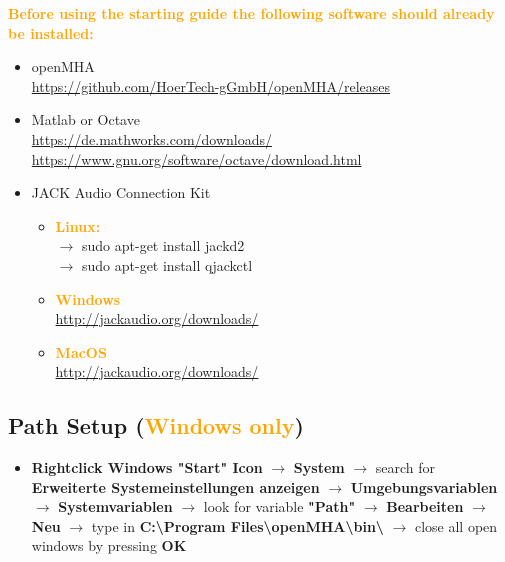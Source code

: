 \documentclass[11pt,a4paper,twoside]{article}
\newcommand{\+}{\discretionary{\mbox{\scriptsize$\hookleftarrow$}}{}{}}
\begin{document}
\textcolor{orange}{\textbf{Before using the starting guide the following software should already be installed:}}

\begin{itemize}
   \item \large{{openMHA}}   \\
     \footnotesize{\url{https://github.com/HoerTech-gGmbH/openMHA/releases}} 
   \item \large{{Matlab or Octave}}    \\
     \footnotesize{\url{https://de.mathworks.com/downloads/}} \\
     \footnotesize{\url{https://www.gnu.org/software/octave/download.html}}
   \item \large{{JACK Audio Connection Kit}}
   \begin{itemize}
   \item \textcolor{orange}{\textbf{Linux:}} \\
   $\rightarrow$ {\ttfamily sudo apt-get install jackd2} \\
   $\rightarrow$ {\ttfamily sudo apt-get install qjackctl}
   \item \textcolor{orange}{\textbf{Windows}} \\
   \footnotesize{\url{http://jackaudio.org/downloads/}}
   \item \textcolor{orange}{\textbf{MacOS}} \\
   \footnotesize{\url{http://jackaudio.org/downloads/}} %
   \end{itemize}
\end{itemize}

\subsection{Path Setup (\textcolor{orange}{Windows only})}
\label{subsec:windows_path_setup}

\begin{itemize}
\item \textbf{Rightclick Windows "Start" Icon} $\rightarrow$ \textbf{System} $\rightarrow$ search for \textbf{Erweiterte Systemeinstellungen anzeigen} $\rightarrow$ \textbf{Umgebungsvariablen} $\rightarrow$ \textbf{Systemvariablen} $\rightarrow$ look for variable \textbf{"Path"} $\rightarrow$ \textbf{Bearbeiten} $\rightarrow$ \textbf{Neu} $\rightarrow$ type in \textbf{C:\textbackslash Program Files\textbackslash openMHA\textbackslash bin\textbackslash} $\rightarrow$ close all open windows by pressing \textbf{OK}
\end{itemize}
\end{document}
